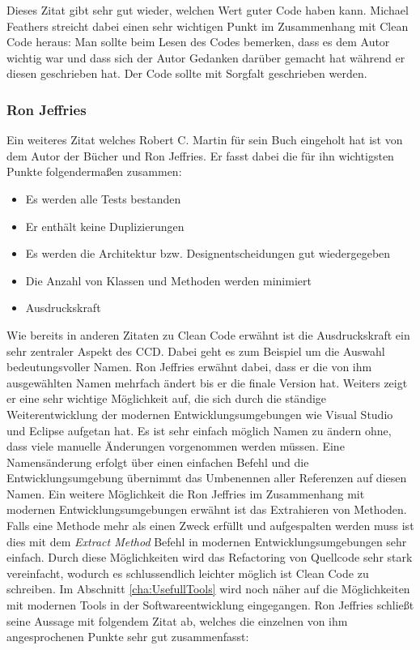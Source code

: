Dieses Zitat gibt sehr gut wieder, welchen Wert guter Code haben kann. Michael Feathers streicht dabei einen sehr wichtigen Punkt im Zusammenhang mit Clean Code heraus: Man sollte beim Lesen des Codes bemerken, dass es dem Autor wichtig war und dass sich der Autor Gedanken darüber gemacht hat während er diesen geschrieben hat. Der Code sollte mit Sorgfalt geschrieben werden.

\subsubsection{Ron Jeffries}
Ein weiteres Zitat welches Robert C. Martin für sein Buch eingeholt hat ist von dem Autor der Bücher \cite{Jeffries2000} und \cite{Jeffries2004} Ron Jeffries. Er fasst dabei die für ihn wichtigsten Punkte folgendermaßen zusammen:

\begin{itemize}
	\item Es werden alle Tests bestanden
	\item Er enthält keine Duplizierungen
	\item Es werden die Architektur bzw. Designentscheidungen gut wiedergegeben
	\item Die Anzahl von Klassen und Methoden werden minimiert
	\item Ausdruckskraft
\end{itemize}

Wie bereits in anderen Zitaten zu Clean Code erwähnt ist die Ausdruckskraft ein sehr zentraler Aspekt des CCD. Dabei geht es zum Beispiel um die Auswahl bedeutungsvoller Namen. Ron Jeffries erwähnt dabei, dass er die von ihm ausgewählten Namen mehrfach ändert bis er die finale Version hat. Weiters zeigt er eine sehr wichtige Möglichkeit auf, die sich durch die ständige Weiterentwicklung der modernen Entwicklungsumgebungen wie Visual Studio und Eclipse aufgetan hat. Es ist sehr einfach möglich Namen zu ändern ohne, dass viele manuelle Änderungen vorgenommen werden müssen. Eine Namensänderung erfolgt über einen einfachen Befehl und die Entwicklungsumgebung übernimmt das Umbenennen aller Referenzen auf diesen Namen. Ein weitere Möglichkeit die Ron Jeffries im Zusammenhang mit modernen Entwicklungsumgebungen erwähnt ist das Extrahieren von Methoden. Falls eine Methode mehr als einen Zweck erfüllt und aufgespalten werden muss ist dies mit dem \textit{Extract Method} Befehl in modernen Entwicklungsumgebungen sehr einfach. Durch diese Möglichkeiten wird das Refactoring von Quellcode sehr stark vereinfacht, wodurch es schlussendlich leichter möglich ist Clean Code zu schreiben. Im Abschnitt \ref{cha:UsefullTools} wird noch näher auf die Möglichkeiten mit modernen Tools in der Softwareentwicklung eingegangen. Ron Jeffries schließt seine Aussage mit folgendem Zitat ab, welches die einzelnen von ihm angesprochenen Punkte sehr gut zusammenfasst:

